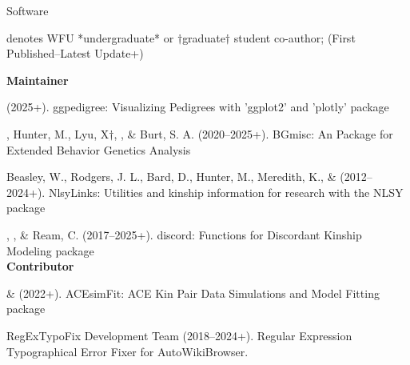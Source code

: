 \begin{rSection}{\textrm{Software}}%
\vspace{-1mm}\begin{center}\footnotesize{denotes WFU *undergraduate* or $\dagger$graduate$\dagger$ student co-author; (First Published–Latest Update+)}\end{center}\vspace{-1mm}

{\large \textbf {Maintainer}}%
\begin{etaremune}
\item \meb (2025+). ggpedigree: Visualizing Pedigrees with 'ggplot2' and 'plotly' \R package %
\item\meb, Hunter, M., Lyu, X$\dagger$, \jt, \& Burt, S. A. (2020–2025+). BGmisc: An \R Package  for Extended Behavior Genetics Analysis %

\item  Beasley, W., Rodgers, J. L., Bard, D., Hunter, M., Meredith, K., \& \meb  (2012–2024+). NlsyLinks: Utilities and kinship information for research with the NLSY \R package 

\item\meb, \jt, \& Ream, C. (2017–2025+). discord: Functions for Discordant Kinship Modeling \R package 
%
%
\smallskip\\
\hspace*{-8mm}\large{\bf{Contributor}}
\item \xyl  \& \meb (2022+). ACEsimFit: ACE Kin Pair Data Simulations and Model Fitting \R package 


\item RegExTypoFix Development Team (2018–2024+). Regular Expression Typographical Error Fixer for Auto\allowbreak WikiBrowser. 
%
%
%
\end{etaremune}
\end{rSection}

